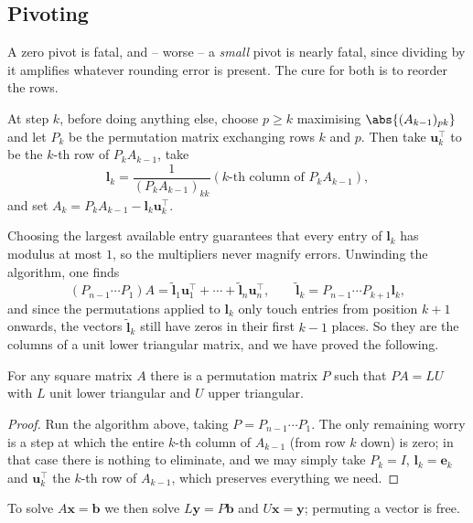 \subsection{Pivoting}

A zero pivot is fatal, and -- worse -- a \emph{small} pivot is nearly fatal, since dividing by it amplifies whatever rounding error is present. The cure for both is to reorder the rows.

\begin{method}
  At step $k$, before doing anything else, choose $p \geq k$ maximising $\abs{(A_{k-1})_{pk}}$ and let $P_k$ be the permutation matrix exchanging rows $k$ and $p$. Then take $\mathbf{u}_k^\top$ to be the $k$-th row of $P_kA_{k-1}$, take
  $$
  \mathbf{l}_k = \frac{1}{(P_kA_{k-1})_{kk}}\left(k\text{-th column of }P_kA_{k-1}\right),
  $$
  and set $A_k = P_kA_{k-1} - \mathbf{l}_k\mathbf{u}_k^\top$.
\end{method}

Choosing the largest available entry guarantees that every entry of $\mathbf{l}_k$ has modulus at most $1$, so the multipliers never magnify errors. Unwinding the algorithm, one finds
$$
(P_{n-1}\cdots P_1)A = \tilde{\mathbf{l}}_1\mathbf{u}_1^\top + \cdots + \tilde{\mathbf{l}}_n\mathbf{u}_n^\top, \qquad \tilde{\mathbf{l}}_k = P_{n-1}\cdots P_{k+1}\mathbf{l}_k,
$$
and since the permutations applied to $\mathbf{l}_k$ only touch entries from position $k+1$ onwards, the vectors $\tilde{\mathbf{l}}_k$ still have zeros in their first $k-1$ places. So they are the columns of a unit lower triangular matrix, and we have proved the following.

\begin{theorem}
  For any square matrix $A$ there is a permutation matrix $P$ such that $PA = LU$ with $L$ unit lower triangular and $U$ upper triangular.
\end{theorem}
\begin{proof}
  Run the algorithm above, taking $P = P_{n-1}\cdots P_1$. The only remaining worry is a step at which the entire $k$-th column of $A_{k-1}$ (from row $k$ down) is zero; in that case there is nothing to eliminate, and we may simply take $P_k = I$, $\mathbf{l}_k = \mathbf{e}_k$ and $\mathbf{u}_k^\top$ the $k$-th row of $A_{k-1}$, which preserves everything we need.
\end{proof}

To solve $A\mathbf{x} = \mathbf{b}$ we then solve $L\mathbf{y} = P\mathbf{b}$ and $U\mathbf{x} = \mathbf{y}$; permuting a vector is free.

